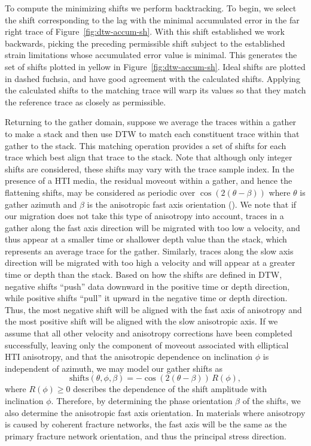 To compute the minimizing shifts we perform backtracking.  To begin, we select the shift corresponding to the lag with the minimal accumulated error in the far right trace of  Figure~\ref{fig:dtw-accum-sh}.  With this shift established we work backwards, picking the preceding permissible shift subject to the established strain limitations whose accumulated error value is minimal.  This generates the set of shifts plotted in yellow in Figure~\ref{fig:dtw-accum-sh}.  Ideal shifts are plotted in dashed fuchsia, and have good agreement with the calculated shifts.  Applying the calculated shifts to the matching trace will warp its values so that they match the reference trace as closely as permissible.

Returning to the gather domain, suppose we average the traces within a gather to make a stack and then use DTW to match each constituent trace within that gather to the stack.  This matching operation provides a set of shifts for each trace which best align that trace to the stack. Note that although only integer shifts are considered, these shifts may vary with the trace sample index. In the presence of a HTI media, the residual moveout within a gather, and hence the flattening shifts, may be considered as periodic over $\cos (2 (\theta-\beta ) )$ where $\theta$ is gather azimuth and $\beta$ is the anisotropic fast axis orientation (\citealp{mallick-1997,grechka-1998}). We note that if our migration does not take this type of anisotropy into account, traces in a gather along the fast axis direction will be migrated with too low a velocity, and thus appear at a smaller time or shallower depth value than the stack, which represents an average trace for the gather.  Similarly, traces along the slow axis direction will be migrated with too high a velocity and will appear at a greater time or depth than the stack.  Based on how the shifts are defined in DTW, negative shifts ``push'' data downward in the positive time or depth direction, while positive shifts ``pull'' it upward in the negative time or depth direction.  Thus, the most negative shift will be aligned with the fast axis of anisotropy and the most positive shift will be aligned with the slow anisotropic axis.  If we assume that all other velocity and anisotropy corrections have been completed successfully, leaving only the component of moveout associated with elliptical HTI anisotropy, and that the anisotropic dependence on inclination $\phi$ is independent of azimuth, we may model our gather shifts as
\begin{equation}
\label{eq:periodicity}
\textrm{shifts} \left( \theta,\phi,\beta \right) =   -\cos \left(2 \left( \theta-\beta \right) \right) \, R \left(\phi \right) ,
\end{equation}
where $R(\phi) \geq 0$ describes the dependence of the shift amplitude with inclination $\phi$.
Therefore, by determining the phase orientation $\beta$ of the shifts, we also determine the anisotropic fast axis orientation.  In materials where anisotropy is caused by coherent fracture networks, the fast axis will be the same as the primary fracture network orientation, and thus the principal stress direction. 

